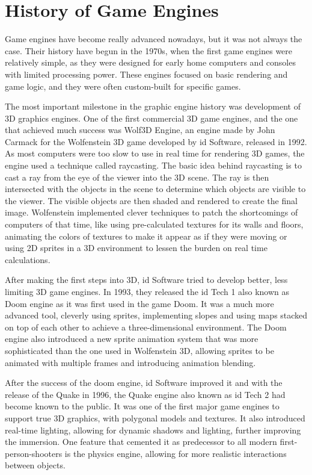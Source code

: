 \newpage
\section{History of Game Engines}
\label{sec:history_game_engines}
\hspace{\parindent}
Game engines have become really advanced nowadays, but it was not always the case. Their history have begun in the 1970s, when the first game engines were relatively simple, as they were designed for early home computers and consoles with limited processing power. These engines focused on basic rendering and game logic, and they were often custom-built for specific games.

The most important milestone in the graphic engine history was development of 3D graphics engines. One of the first commercial 3D game engines, and the one that achieved much success was Wolf3D Engine, an engine made by John Carmack for the Wolfenstein 3D game developed by id Software, released in 1992. As most computers were too slow to use in real time for rendering 3D games, the engine used a technique called raycasting. The basic idea behind raycasting is to cast a ray from the eye of the viewer into the 3D scene. The ray is then intersected with the objects in the scene to determine which objects are visible to the viewer. The visible objects are then shaded and rendered to create the final image. Wolfenstein implemented clever techniques to patch the shortcomings of computers of that time, like using pre-calculated textures for its walls and floors, animating the colors of textures to make it appear as if they were moving or using 2D sprites in a 3D environment to lessen the burden on real time calculations.

After making the first steps into 3D, id Software tried to develop better, less limiting 3D game engines. In 1993, they released the id Tech 1 also known as Doom engine as it was first used in the game Doom. It was a much more advanced tool, cleverly using sprites, implementing slopes and using maps stacked on top of each other to achieve a three-dimensional environment. The Doom engine also introduced a new sprite animation system that was more sophisticated than the one used in Wolfenstein 3D, allowing sprites to be animated with multiple frames and introducing animation blending. 

After the success of the doom engine, id Software improved it and with the release of the Quake in 1996, the Quake engine also known as id Tech 2 had become known to the public. It was one of the first major game engines to support true 3D graphics, with polygonal models and textures. It also introduced real-time lighting, allowing for dynamic shadows and lighting, further improving the immersion. One feature that cemented it as predecessor to all modern first-person-shooters is the physics engine, allowing for more realistic interactions between objects.

